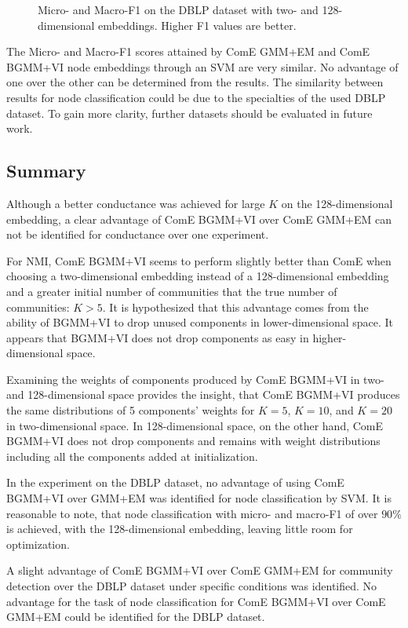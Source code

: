 \documentclass[conference]{IEEEtran}
\begin{document}
\begin{figure}[H]
    \caption{Micro- and Macro-F1 on the DBLP dataset with two- and 128-dimensional embeddings. Higher F1 values are better.}
    \label{table:dblp_f1}
\end{figure}

The Micro- and Macro-F1 scores attained by ComE GMM+EM and ComE BGMM+VI node embeddings through an SVM are very similar. No advantage of one over the other can be determined from the results. The similarity between results for node classification could be due to the specialties of the used DBLP dataset. To gain more clarity, further datasets should be evaluated in future work.


\subsection{Summary}

Although a better conductance was achieved for large $K$ on the 128-dimensional embedding, a clear advantage of ComE BGMM+VI over ComE GMM+EM can not be identified for conductance over one experiment.

For NMI, ComE BGMM+VI seems to perform slightly better than ComE when choosing a two-dimensional embedding instead of a 128-dimensional embedding and a greater initial number of communities that the true number of communities: $K>5$. It is hypothesized that this advantage comes from the ability of BGMM+VI to drop unused components in lower-dimensional space. It appears that BGMM+VI does not drop components as easy in higher-dimensional space.

Examining the weights of components produced by ComE BGMM+VI in two- and 128-dimensional space provides the insight, that ComE BGMM+VI produces the same distributions of 5 components' weights for $K=5$, $K=10$, and $K=20$ in two-dimensional space. In 128-dimensional space, on the other hand, ComE BGMM+VI does not drop components and remains with weight distributions including all the components added at initialization.

In the experiment on the DBLP dataset, no advantage of using ComE BGMM+VI over GMM+EM was identified for node classification by SVM. It is reasonable to note, that node classification with micro- and macro-F1 of over $90\%$ is achieved, with the 128-dimensional embedding, leaving little room for optimization.

A slight advantage of ComE BGMM+VI over ComE GMM+EM for community detection over the DBLP dataset under specific conditions was identified. No advantage for the task of node classification for ComE BGMM+VI over ComE GMM+EM could be identified for the DBLP dataset.
\end{document}
